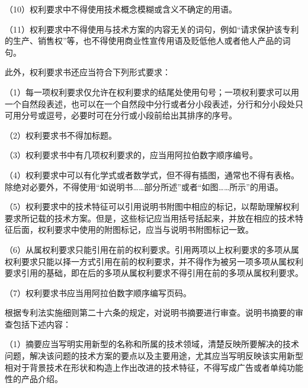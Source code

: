 {\setlength{\parindent}{17.1bp}（10）权利要求中不得使用技术概念模糊或含义不确定的用语。\par}

{\setlength{\parindent}{17.1bp}（11）权利要求中不得使用与技术方案的内容无关的词句，例如“请求保护该专利的生产、销售权”等，也不得使用商业性宣传用语及贬低他人或者他人产品的词句。\par}

此外，权利要求书还应当符合下列形式要求：

{\setlength{\parindent}{17.1bp}（1）每一项权利要求仅允许在权利要求的结尾处使用句号；一项权利要求可以用一个自然段表述，也可以在一个自然段中分行或者分小段表述，分行和分小段处只可用分号或逗号，必要时可在分行或小段前给出其排序的序号。\par}

{\setlength{\parindent}{17.1bp}（2）权利要求书不得加标题。\par}

{\setlength{\parindent}{17.1bp}（3）权利要求书中有几项权利要求的，应当用阿拉伯数字顺序编号。\par}

{\setlength{\parindent}{17.1bp}（4）权利要求中可以有化学式或者数学式，但不得有插图，通常也不得有表格。除绝对必要外，不得使用“如说明书……部分所述”或者“如图……所示”的用语。\par}

{\setlength{\parindent}{17.1bp}（5）权利要求中的技术特征可以引用说明书附图中相应的标记，以帮助理解权利要求所记载的技术方案。但是，这些标记应当用括号括起来，并放在相应的技术特征后面，权利要求中使用的附图标记，应当与说明书附图标记一致。\par}

{\setlength{\parindent}{17.1bp}（6）从属权利要求只能引用在前的权利要求。引用两项以上权利要求的多项从属权利要求只能以择一方式引用在前的权利要求，并不得作为被另一项多项从属权利要求引用的基础，即在后的多项从属权利要求不得引用在前的多项从属权利要求。\par}

{\setlength{\parindent}{17.1bp}（7）权利要求书应当用阿拉伯数字顺序编写页码。\par}

根据专利法实施细则第二十六条的规定，对说明书摘要进行审查。说明书摘要的审查包括下述内容：

{\setlength{\parindent}{17.1bp}（1）摘要应当写明实用新型的名称和所属的技术领域，清楚反映所要解决的技术问题，解决该问题的技术方案的要点以及主要用途，尤其应当写明反映该实用新型相对于背景技术在形状和构造上作出改进的技术特征，不得写成广告或者单纯功能性的产品介绍。\par}

